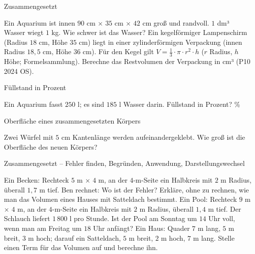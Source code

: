 \begin{aufgabe}{Zusammengesetzt}
\begin{teile}
\teil Ein Aquarium ist innen $90$ cm × $35$ cm × $42$ cm groß und randvoll. $1$ dm³ Wasser wiegt $1$ kg. Wie schwer ist das Wasser? \leerfeld[kg]
\teil Ein kegelförmiger Lampenschirm (Radius $18$ cm, Höhe $35$ cm) liegt in einer zylinderförmigen Verpackung (innen Radius $18{,}5$ cm, Höhe $36$ cm). Für den Kegel gilt $V = \tfrac{1}{3} \cdot \pi \cdot r^2 \cdot h$ ($r$ Radius, $h$ Höhe; Formelsammlung). Berechne das Restvolumen der Verpackung in cm³ \hfill (P10 2024 OS). \leerfeld[cm³]
\end{teile}
\end{aufgabe}

\begin{aufgabe}{Füllstand in Prozent}
\begin{teile}
\teil Ein Aquarium fasst $250$ l; es sind $185$ l Wasser darin. Füllstand in Prozent? \leerfeld \%
\end{teile}
\end{aufgabe}

\begin{aufgabe}{Oberfläche eines zusammengesetzten Körpers}
\begin{teile}
\teil Zwei Würfel mit $5$ cm Kantenlänge werden aufeinandergeklebt. Wie groß ist die Oberfläche des neuen Körpers? \leerfeld[cm²]
\end{teile}
\end{aufgabe}

\begin{aufgabe}{Zusammengesetzt – Fehler finden, Begründen, Anwendung, Darstellungswechsel}
\begin{teile}
\teil Ein Becken: Rechteck $5$ m × $4$ m, an der $4$-m-Seite ein Halbkreis mit $2$ m Radius, überall $1{,}7$ m tief. Ben rechnet:  Wo ist der Fehler?
\teil Erkläre, ohne zu rechnen, wie man das Volumen eines Hauses mit Satteldach bestimmt.
\teil Ein Pool: Rechteck $9$ m × $4$ m, an der $4$-m-Seite ein Halbkreis mit $2$ m Radius, überall $1{,}4$ m tief. Der Schlauch liefert $1\,800$ l pro Stunde. Ist der Pool am Sonntag um $14$ Uhr voll, wenn man am Freitag um $18$ Uhr anfängt?
\teil Ein Haus: Quader $7$ m lang, $5$ m breit, $3$ m hoch; darauf ein Satteldach, $5$ m breit, $2$ m hoch, $7$ m lang. Stelle einen Term für das Volumen auf und berechne ihn. \leerfeld[m³]
\end{teile}
\end{aufgabe}
